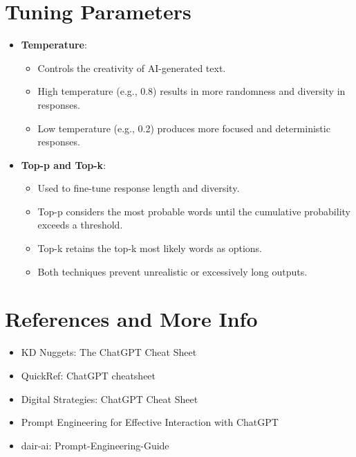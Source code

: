 \section{Tuning Parameters}

\begin{itemize}
\itemsep-0.25em %
\item \textbf{Temperature}:
	\begin{itemize}
	\itemsep-0.25em %

	\item Controls the creativity of AI-generated text.
	\item High temperature (e.g., 0.8) results in more randomness and diversity in responses.
	\item Low temperature (e.g., 0.2) produces more focused and deterministic responses.
	\end{itemize}
\item \textbf{Top-p and Top-k}:
	\begin{itemize}
	\itemsep-0.25em %

	\item Used to fine-tune response length and diversity.
	\item Top-p considers the most probable words until the cumulative probability exceeds a threshold.
	\item Top-k retains the top-k most likely words as options.
	\item Both techniques prevent unrealistic or excessively long outputs.
	\end{itemize}
\end{itemize}

\section{References and More Info}

\begin{itemize}
\itemsep-0.25em %
\item KD Nuggets: The ChatGPT Cheat Sheet
\item QuickRef: ChatGPT cheatsheet
\item Digital Strategies: ChatGPT Cheat Sheet
\item Prompt Engineering for Effective Interaction with ChatGPT
\item dair-ai: Prompt-Engineering-Guide
\end{itemize}